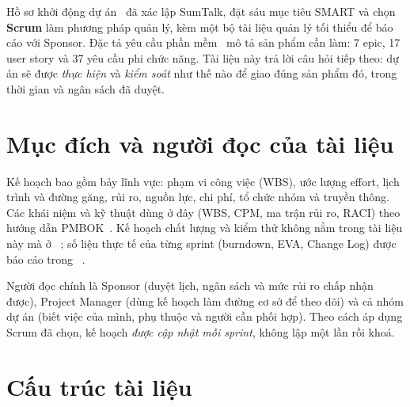 \documentclass[12pt,a4paper]{report}
\begin{document}
Hồ sơ khởi động dự án~\cite{pid} đã xác lập SumTalk, đặt sáu mục tiêu SMART và chọn \textbf{Scrum} làm phương
pháp quản lý, kèm một bộ tài liệu quản lý tối thiểu để báo cáo với Sponsor. Đặc tả yêu cầu phần
mềm~\cite{srs} mô tả sản phẩm cần làm: 7 epic, 17 user story và 37 yêu cầu phi chức năng. Tài liệu này trả lời
câu hỏi tiếp theo: dự án sẽ được \emph{thực hiện} và \emph{kiểm soát} như thế nào để giao đúng sản phẩm đó,
trong thời gian và ngân sách đã duyệt.

\section{Mục đích và người đọc của tài liệu}

Kế hoạch bao gồm bảy lĩnh vực: phạm vi công việc (WBS), ước lượng effort, lịch trình và đường găng, rủi ro,
nguồn lực, chi phí, tổ chức nhóm và truyền thông. Các khái niệm và kỹ thuật dùng ở đây (WBS, CPM, ma trận rủi ro,
RACI) theo hướng dẫn PMBOK~\cite{pmbok}. Kế hoạch chất lượng và kiểm thử không nằm trong tài liệu này mà ở
~\cite{qtd}; số liệu thực tế của từng sprint (burndown, EVA, Change Log) được
báo cáo trong ~\cite{mcr}.

Người đọc chính là Sponsor (duyệt lịch, ngân sách và mức rủi ro chấp nhận được), Project Manager (dùng kế hoạch
làm đường cơ sở để theo dõi) và cả nhóm dự án (biết việc của mình, phụ thuộc và người cần phối hợp). Theo cách áp
dụng Scrum đã chọn, kế hoạch \emph{được cập nhật mỗi sprint}, không lập một lần rồi khoá.

\section{Cấu trúc tài liệu}
\end{document}
